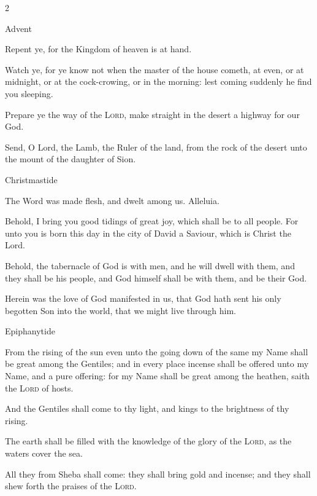 \begin{multicols}{2}
\centerline{\color{RubricRed}\small%
Advent}
\par\noindent
    Repent ye, for the Kingdom of heaven is at hand.
    \par
    Watch ye, for ye know not when the master of the house cometh, at even, or at midnight, or at the cock-crowing, or in the morning: lest coming suddenly he find you sleeping.
    \par
    Prepare ye the way of the \textsc{Lord}, make straight in the desert a highway for our God.\par
    Send, O Lord, the Lamb, the Ruler of the land, from the rock of the desert unto the mount of the daughter of Sion.\\%
    
\centerline{\color{RubricRed}\small%
Christmastide}
\par\noindent
    The Word was made flesh, and dwelt among us. Alleluia. \par
    Behold, I bring you good tidings of great joy, which shall be to all people. For unto you is born this day in the city of David a Saviour, which is Christ the Lord.
    \par
    Behold, the tabernacle of God is with men, and he will dwell with them, and they shall be his people, and God himself shall be with them, and be their God.
    \par
    Herein was the love of God manifested in us, that God hath sent his only begotten Son into the world, that we might live through him. \\

\centerline{\color{RubricRed}\small%
Epiphanytide}
\par\noindent
    From the rising of the sun even unto the going down of the same my Name shall be great among the Gentiles; and in every place incense shall be offered unto my Name, and a pure offering: for my Name shall be great among the heathen, saith the \textsc{Lord} of hosts.
    
    And the Gentiles shall come to thy light, and kings to the brightness of thy rising.\par
    The earth shall be filled with the knowledge of the glory of the \textsc{Lord}, as the waters cover the sea.\par
	All they from Sheba shall come: they shall bring gold and incense; and they shall shew forth the praises of the \textsc{Lord}.
	

\end{multicols}
